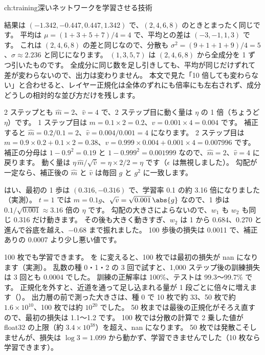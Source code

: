\begin{answers}{ch:training}{深いネットワークを学習させる技術}
\item 結果は $(-1.342, -0.447, 0.447, 1.342)$ で、$(2,4,6,8)$ のときとまったく同じです。
平均は $\mu=(1+3+5+7)/4=4$ で、平均との差は $(-3,-1,1,3)$ です。
これは $(2,4,6,8)$ の差と同じなので、分散も $\sigma^2=(9+1+1+9)/4=5$、$\sigma\approx2.236$ と同じになります。
$(1,3,5,7)$ は $(2,4,6,8)$ から全成分を 1 ずつ引いたものです。
全成分に同じ数を足し引きしても、平均が同じだけずれて差が変わらないので、出力は変わりません。
本文で見た「10 倍しても変わらない」と合わせると、レイヤー正規化は全体のずれにも倍率にも左右されず、成分どうしの相対的な並び方だけを残します。
\item 2 ステップとも $\hat m=2$、$\hat v=4$ で、2 ステップ目に動く量は $\eta$ の 1 倍（ちょうど $\eta$）です。
1 ステップ目は $m=0.1\times2=0.2$、$v=0.001\times4=0.004$ です。
補正すると $\hat m=0.2/0.1=2$、$\hat v=0.004/0.001=4$ になります。
2 ステップ目は $m=0.9\times0.2+0.1\times2=0.38$、$v=0.999\times0.004+0.001\times4=0.007996$ です。
補正の分母は $1-0.9^2=0.19$ と $1-0.999^2=0.001999$ なので、$\hat m=2$、$\hat v=4$ に戻ります。
動く量は $\eta\,\hat m/\sqrt{\hat v}=\eta\times2/2=\eta$ です（$\epsilon$ は無視しました）。
勾配が一定なら、補正後の $\hat m$ と $\hat v$ は毎回 $g$ と $g^2$ に一致します。
\item はい、最初の 1 歩は $(0.316, -0.316)$ で、学習率 0.1 の約 3.16 倍になりました（実測）。
$t=1$ では $m=0.1g$、$\sqrt{v}=\sqrt{0.001}\,\abs{g}$ なので、1 歩は $0.1/\sqrt{0.001}\approx3.16$ 倍の $\eta$ です。
勾配の大きさによらないので、$w_1$ も $w_2$ も同じ 0.316 だけ動きます。
その後も大きく動きすぎ、$w_2$ は 1 から 0.684、0.270 と進んで谷底を越え、$-0.68$ まで振れました。
100 歩後の損失は 0.0011 で、補正ありの 0.0007 より少し悪い値です。
\item 100 枚でも学習できます。 を  に変えると、100 枚では最初の損失が nan になります（実測）。
乱数の種 0・1・2 の 3 回で試すと、1,000 ステップ後の訓練損失は 3 回とも 0.0004 でした。
訓練の正解率は 100\%、テストは 99.3〜99.7\% です。
正規化を外すと、近道を通って足し込まれる量が 1 段ごとに倍々に増えます（）。
出力層の前で測った大きさは、種 0 で 10 枚で約 33、50 枚で約 $1.6\times10^{10}$、100 枚では約 $10^{20}$ でした。
50 枚までは最後の正規化がそろえ直すので、最初の損失は 1.1〜1.2 です。
100 枚では分散の計算で 2 乗した値が float32 の上限（約 $3.4\times10^{38}$）を超え、nan になります。
50 枚では発散こそしませんが、損失は $\log3=1.099$ から動かず、学習できませんでした（10 枚なら学習できます）。

\end{answers}
